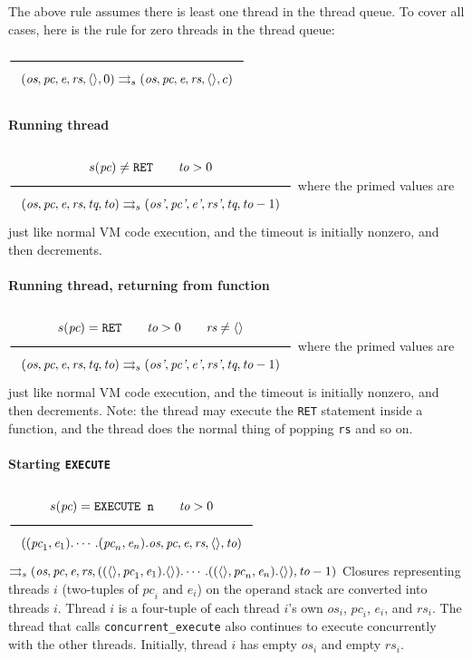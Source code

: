 The above rule assumes there is least one thread in the thread queue. To cover all cases, here is the rule for zero threads in the thread queue:
\(\\\Rule{}{(\textit{os}, \textit{pc}, \textit{e}, \textit{rs}, \langle \rangle, 0) \transition (\textit{os}, \textit{pc}, \textit{e}, \textit{rs}, \langle \rangle, c)}\\\)

\paragraph{Running thread}
\label{sec:orgfa4cc96}
\(\\\Rule{s(\textit{pc}) \neq \texttt{RET} \qquad \textit{to} > 0}{(\textit{os}, \textit{pc}, \textit{e}, \textit{rs}, \textit{tq}, \textit{to}) \transition (\textit{os'}, \textit{pc'}, \textit{e'}, \textit{rs'}, \textit{tq}, \textit{to}-1)}\\\)
where the primed values are just like normal VM code execution, and the timeout is initially nonzero, and then decrements.

\paragraph{Running thread, returning from function}
\label{sec:orgc0cd6b5}
\(\\\Rule{s(\textit{pc}) = \texttt{RET} \qquad \textit{to} > 0 \qquad \textit{rs} \neq \langle \rangle}{(\textit{os}, \textit{pc}, \textit{e}, \textit{rs}, \textit{tq}, \textit{to}) \transition (\textit{os'}, \textit{pc'}, \textit{e'}, \textit{rs'}, \textit{tq}, \textit{to}-1)}\\\)
where the primed values are just like normal VM code execution, and the timeout is initially nonzero, and then decrements. Note: the thread may execute the \texttt{RET} statement inside a function, and the thread does the normal thing of popping \texttt{rs} and so on.

\paragraph{Starting \texttt{EXECUTE}}
\label{sec:org6246ae4}
\(\\\Rule{s(\textit{pc}) = \texttt{EXECUTE n} \qquad \textit{to} > 0}{((\textit{pc}_1, \textit{e}_1). \cdots .(\textit{pc}_n, \textit{e}_n).\textit{os}, \textit{pc}, \textit{e}, \textit{rs}, \langle \rangle, \textit{to})}\\\)
\(\rightrightarrows_s (\textit{os}, \textit{pc}, \textit{e}, \textit{rs}, ((\langle \rangle, \textit{pc}_1, \textit{e}_1).\langle \rangle). \cdots .((\langle \rangle, \textit{pc}_n, \textit{e}_n).\langle \rangle), \textit{to}-1)\\\)
Closures representing threads \(i\) (two-tuples of \(\textit{pc}_i\) and \(\textit{e}_i\)) on the operand stack are converted into threads \(i\). Thread \(i\) is a four-tuple of each thread \(i\)'s own \(\textit{os}_i\), \(\textit{pc}_i\), \(\textit{e}_i\), and \(\textit{rs}_i\). The thread that calls \texttt{concurrent\_execute} also continues to execute concurrently with the other threads. Initially, thread \(i\) has empty \(\textit{os}_i\) and empty \(\textit{rs}_i\).

